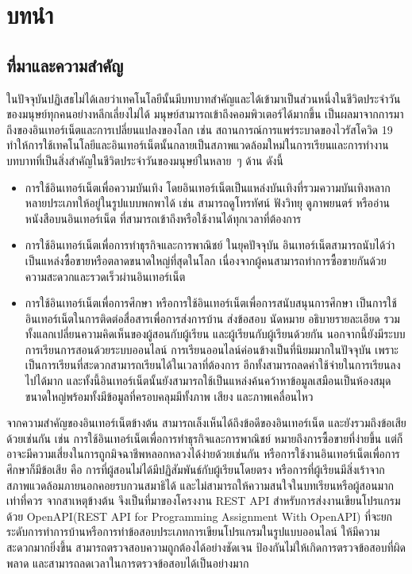 \chapter{บทนำ}
\label{chapter1}

\section{ที่มาและความสำคัญ}
ในปัจจุบันปฏิเสธไม่ได้เลยว่าเทคโนโลยีนั้นมีบทบาทสำคัญและได้เข้ามาเป็นส่วนหนึ่งในชีวิตประจำวันของมนุษย์ทุกคนอย่างหลีกเลี่ยงไม่ได้ มนุษย์สามารถเข้าถึงคอมพิวเตอร์ได้มากขึ้น เป็นผลมาจากการมาถึงของอินเทอร์เน็ตและการเปลี่ยนแปลงของโลก  เช่น สถานการณ์การแพร่ระบาดของไวรัสโควิด 19 ทำให้การใช้เทคโนโลยีและอินเทอร์เน็ตนั้นกลายเป็นสภาพแวดล้อมใหม่ในการเรียนและการทำงาน บทบาทที่เป็นสิ่งสำคัญในชีวิตประจำวันของมนุษย์ใน\mbox{หลาย ๆ} ด้าน ดังนี้
\begin{itemize}
    \item การใช้อินเทอร์เน็ตเพื่อความบันเทิง โดยอินเทอร์เน็ตเป็นแหล่งบันเทิงที่รวมความบันเทิงหลากหลายประเภทให้อยู่ในรูปแบบพกพาได้ เช่น สามารถดูโทรทัศน์ ฟังวิทยุ ดูภาพยนตร์ หรืออ่านหนังสือบนอินเทอร์เน็ต ที่สามารถเข้าถึงหรือใช้งานได้ทุกเวลาที่ต้องการ 
    \item การใช้อินเทอร์เน็ตเพื่อการทำธุรกิจและการพาณิชย์ ในยุคปัจจุบัน อินเทอร์เน็ตสามารถนับได้ว่าเป็นแหล่งซื้อขายหรือตลาดขนาดใหญ่ที่สุดในโลก เนื่องจากผู้คนสามารถทำการซื้อขายกันด้วยความสะดวกและรวดเร็วผ่านอินเทอร์เน็ต
    \item การใช้อินเทอร์เน็ตเพื่อการศึกษา หรือการใช้อินเทอร์เน็ตเพื่อการสนับสนุนการศึกษา เป็นการใช้อินเทอร์เน็ตในการติดต่อสื่อสารเพื่อการส่งการบ้าน ส่งข้อสอบ นัดหมาย อธิบายรายละเอียด รวมทั้งแลกเปลี่ยนความคิดเห็นของผู้สอนกับผู้เรียน และผู้เรียนกับผู้เรียนด้วยกัน นอกจากนี้ยังมีระบบการเรียนการสอนด้วยระบบออนไลน์ การเรียนออนไลน์ค่อนข้างเป็นที่นิยมมากใน\mbox{ปัจจุบัน} เพราะเป็นการเรียนที่สะดวกสามารถเรียนได้ในเวลาที่ต้องการ อีกทั้งสามารถลดค่าใช้จ่ายในการเรียนลงไปได้มาก และทั้งนี้อินเทอร์เน็ตนั้นยังสามารถใช้เป็นแหล่งค้นคว้าหาข้อมูลเสมือนเป็นห้องสมุดขนาดใหญ่พร้อมทั้งมีข้อมูลที่ครอบคลุมมีทั้งภาพ เสียง และภาพเคลื่อนไหว
\end{itemize}
จากความสำคัญของอินเทอร์เน็ตข้างต้น สามารถเล็งเห็นได้ถึงข้อดีของอินเทอร์เน็ต และยังรวมถึงข้อเสียด้วยเช่นกัน เช่น การใช้อินเทอร์เน็ตเพื่อการทำธุรกิจและการพาณิชย์ หมายถึงการซื้อขายที่ง่ายขึ้น แต่ก็อาจะมีความเสี่ยงในการถูกมิจฉาชีพหลอกหลวงได้ง่ายด้วยเช่นกัน หรือการใช้งานอินเทอร์เน็ตเพื่อการศึกษาก็มีข้อเสีย คือ การที่ผู้สอนไม่ได้มีปฏิสัมพันธ์กับผู้เรียนโดยตรง หรือการที่ผู้เรียนมีสิ่งเร้าจากสภาพแวดล้อมภายนอกคอยรบกวนสมาธิได้ และไม่สามารถให้ความสนใจในบทเรียนหรือผู้สอนมากเท่าที่ควร
จากสาเหตุข้างต้น จึงเป็นที่มาของโครงงาน REST API สำหรับการส่งงานเขียนโปรแกรมด้วย OpenAPI(REST API for Programming Assignment With OpenAPI) ที่จะยกระดับการทำการบ้านหรือการทำข้อสอบประเภทการเขียนโปรแกรมในรูปแบบออนไลน์ ให้มีความสะดวกมากยิ่งขึ้น สามารถตรวจสอบความถูกต้องได้อย่างชัดเจน ป้องกันไม่ให้เกิดการตรวจข้อสอบที่ผิดพลาด และสามารถลดเวลาในการตรวจข้อสอบได้เป็นอย่างมาก
